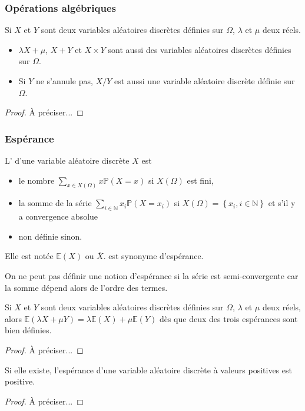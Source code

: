 \subsubsection{Opérations algébriques}
\begin{theorem}
Si \(𝑋\) et \(𝑌\) sont deux variables aléatoires discrètes définies sur \(Ω\), \(𝜆\) et \(𝜇\) deux réels.
\begin{itemize}
\item
\(𝜆𝑋+𝜇\),
\(𝑋+𝑌\) et \(𝑋×𝑌\) sont aussi des variables aléatoires discrètes définies sur \(Ω\).
\item
Si \(𝑌\) ne s'annule pas,
\(𝑋/𝑌\) est aussi une variable aléatoire discrète définie sur  \(Ω\).
\end{itemize}
\end{theorem}
\begin{proof}
À préciser...
\end{proof}
\subsubsection[Espérance]{Espérance}
\begin{definition}
[Espérance]
L' d'une variable aléatoire discrète \(𝑋\) est
\begin{itemize}
\item
le nombre  \(∑_{𝑥∈𝑋(Ω)}𝑥ℙ(𝑋=𝑥)\) si \(𝑋(Ω)\) est fini, 
\item
la somme de la série \(∑_{𝑖∈ℕ}𝑥_{𝑖}ℙ(𝑋=𝑥_{𝑖})\) si \(𝑋(Ω)=\left\{𝑥_{𝑖},𝑖∈ℕ\right\}\) et
s'il y a convergence absolue
\item
non définie sinon.
\end{itemize}
Elle est notée \(𝔼(𝑋)\) ou \(\overline{𝑋}\).
 est synonyme d'espérance.
\end{definition}
\begin{remark}
On ne peut pas définir une notion d'espérance si la série est semi-convergente car la
somme dépend alors de l'ordre des termes.
\end{remark}
\begin{theorem}
Si \(𝑋\) et \(𝑌\) sont deux variables aléatoires discrètes définies sur \(Ω\), \(𝜆\) et \(𝜇\) deux réels, alors
\(𝔼(𝜆𝑋+𝜇𝑌)=𝜆𝔼(𝑋)+𝜇𝔼(𝑌)\) dès que deux des trois espérances sont bien définies.
\end{theorem}
\begin{proof}
À préciser...
\end{proof}
\begin{theorem}
Si elle existe, l'espérance d'une variable aléatoire discrète à valeurs positives est positive.
\end{theorem}
\begin{proof}
À préciser...
\end{proof}
